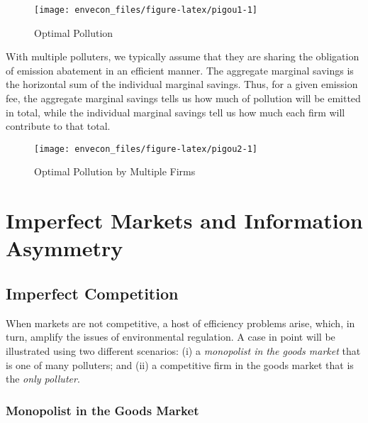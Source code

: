 \documentclass[
]{book}
\begin{document}
\begin{figure}

{\centering \texttt{[image: envecon\_files/figure-latex/pigou1-1]} 

}

\caption{Optimal Pollution}\label{fig:pigou1}
\end{figure}

With multiple polluters, we typically assume that they are sharing the obligation of emission abatement in an efficient manner. The aggregate marginal savings is the horizontal sum of the individual marginal savings. Thus, for a given emission fee, the aggregate marginal savings tells us how much of pollution will be emitted in total, while the individual marginal savings tell us how much each firm will contribute to that total.

\begin{figure}

{\centering \texttt{[image: envecon\_files/figure-latex/pigou2-1]} 

}

\caption{Optimal Pollution by Multiple Firms}\label{fig:pigou2}
\end{figure}

\hypertarget{imperfect-markets-and-information-asymmetry}{%
\chapter{Imperfect Markets and Information Asymmetry}\label{imperfect-markets-and-information-asymmetry}}

\hypertarget{imperfect-competition}{%
\section{Imperfect Competition}\label{imperfect-competition}}

When markets are not competitive, a host of efficiency problems arise, which, in turn, amplify the issues of environmental regulation. A case in point will be illustrated using two different scenarios: (i) a \emph{monopolist in the goods market} that is one of many polluters; and (ii) a competitive firm in the goods market that is the \emph{only polluter}.

\hypertarget{monopolist-in-the-goods-market}{%
\subsection{Monopolist in the Goods Market}\label{monopolist-in-the-goods-market}}
\end{document}
